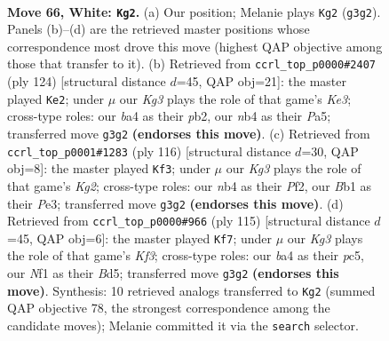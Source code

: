 \documentclass[11pt]{article}
\begin{document}
\clearpage

\begin{figure}[p]\centering
\begin{subfigure}{0.46\textwidth}\centering
\resizebox{\linewidth}{!}{%
\newchessgame
\chessboard[
  setfen={8/2r2p1p/6p1/4P3/bn3Pp1/6K1/4k2P/1B3N2 w - - 22 66},
  showmover=false,
  pgfstyle=straightmove, color=movearrow, markmove={g3-g2}
]}
\caption{}
\end{subfigure}\hfill
\begin{subfigure}{0.46\textwidth}\centering
\resizebox{\linewidth}{!}{%
\newchessgame
\chessboard[
  setfen={8/6p1/p4pP1/P3pP2/4P3/4K3/1pkN4/8 w - - 11 63},
  showmover=false,
  pgfstyle=straightmove, color=movearrow, markmove={e3-e2}
]}
\caption{}
\end{subfigure}
\\[4pt]
\begin{subfigure}{0.46\textwidth}\centering
\resizebox{\linewidth}{!}{%
\newchessgame
\chessboard[
  setfen={2B5/2b4p/5kp1/5p2/1n3N2/1P2P2P/5PK1/8 w - - 10 59},
  showmover=false,
  pgfstyle=straightmove, color=movearrow, markmove={g2-f3}
]}
\caption{}
\end{subfigure}\hfill
\begin{subfigure}{0.46\textwidth}\centering
\resizebox{\linewidth}{!}{%
\newchessgame
\chessboard[
  setfen={8/4p3/5k2/1pPb1Pp1/p5P1/P1B5/4K3/8 b - - 35 58},
  showmover=false,
  pgfstyle=straightmove, color=movearrow, markmove={f6-f7}
]}
\caption{}
\end{subfigure}
\caption{\textbf{Move 66, White: \texttt{Kg2}.} (a) Our position; Melanie plays \texttt{Kg2} (\texttt{g3g2}). Panels (b)--(d) are the retrieved master positions whose correspondence most drove this move (highest QAP objective among those that transfer to it). (b) Retrieved from \texttt{ccrl\_top\_p0000\#2407} (ply 124) [structural distance $d$=45, QAP obj=21]: the master played \texttt{Ke2}; under $\mu$ our \emph{Kg3} plays the role of that game's \emph{Ke3}; cross-type roles: our \emph{b}a4 as their \emph{p}b2, our \emph{n}b4 as their \emph{P}a5; transferred move \texttt{g3g2} \textbf{(endorses this move)}. (c) Retrieved from \texttt{ccrl\_top\_p0001\#1283} (ply 116) [structural distance $d$=30, QAP obj=8]: the master played \texttt{Kf3}; under $\mu$ our \emph{Kg3} plays the role of that game's \emph{Kg2}; cross-type roles: our \emph{n}b4 as their \emph{P}f2, our \emph{B}b1 as their \emph{P}e3; transferred move \texttt{g3g2} \textbf{(endorses this move)}. (d) Retrieved from \texttt{ccrl\_top\_p0000\#966} (ply 115) [structural distance $d$=45, QAP obj=6]: the master played \texttt{Kf7}; under $\mu$ our \emph{Kg3} plays the role of that game's \emph{Kf3}; cross-type roles: our \emph{b}a4 as their \emph{p}c5, our \emph{N}f1 as their \emph{B}d5; transferred move \texttt{g3g2} \textbf{(endorses this move)}. Synthesis: 10 retrieved analogs transferred to \texttt{Kg2} (summed QAP objective 78, the strongest correspondence among the candidate moves); Melanie committed it via the \texttt{search} selector.}
\label{fig:thought-m130}
\end{figure}
\end{document}
